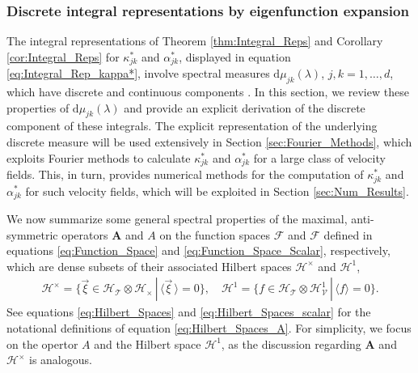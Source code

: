 \documentclass[11pt]{amsart}
\renewcommand{\d}{\mathrm{d}}
\newcommand{\Ab}{\mathbf{A}}
\newcommand{\Tc}{\mathcal{T}}
\newcommand{\Vc}{\mathcal{V}}
\newcommand{\Hc}{\mathcal{H}}
\newcommand{\Fc}{\mathcal{F}}
\newcommand{\Hs}{\mathscr{H}}
\newcommand{\Fs}{\mathscr{F}}
\begin{document}
\subsubsection{Discrete integral representations by eigenfunction
  expansion}\label{sec:Eig_Funct_Exp} 
%
The integral representations of Theorem \ref{thm:Integral_Reps} and
Corollary \ref{cor:Integral_Reps} for $\kappa^*_{jk}$ and $\alpha^*_{jk}$,
displayed in equation \eqref{eq:Integral_Rep_kappa*},  involve
spectral measures $\d\mu_{jk}(\lambda)$, $j,k=1,\ldots,d$, which have discrete and
continuous components \cite{Reed-1980,Stone:64}. In this section, we
review these properties of $\d\mu_{jk}(\lambda)$ and provide an explicit
derivation of the discrete component of these integrals. The 
explicit representation of the underlying discrete measure will
be used extensively in Section \ref{sec:Fourier_Methods}, which
exploits Fourier methods to calculate $\kappa^*_{jk}$ and $\alpha^*_{jk}$ for a
large class of velocity fields. This, in turn, provides numerical
methods for the computation of $\kappa^*_{jk}$ and $\alpha^*_{jk}$ for such
velocity fields, which will be exploited in Section
\ref{sec:Num_Results}.   



We now summarize some general spectral properties of the maximal,
anti-symmetric operators $\Ab$ and $A$ on the function spaces $\Fs$
and $\Fc$ defined in equations \eqref{eq:Function_Space} and
\eqref{eq:Function_Space_Scalar}, respectively, which are dense
subsets of their associated Hilbert spaces $\Hs^\times$ and $\Hc^1$,  
%
\begin{align}\label{eq:Hilbert_Spaces_A}
  \Hs^\times=\{\vec{\xi}\in \Hs_\Tc\otimes\Hs_\times \,|\, \langle\vec{\xi}\,\rangle=0\},\quad
  \Hc^1=\{f\in \Hc_\Tc\otimes\Hc^1_\Vc \,|\, \langle f\rangle=0\}.
\end{align}
%
See equations \eqref{eq:Hilbert_Spaces} and
\eqref{eq:Hilbert_Spaces_scalar} for the notational definitions of
equation \eqref{eq:Hilbert_Spaces_A}. For simplicity, we focus on the 
opertor $A$ and the Hilbert space $\Hc^1$, as the discussion regarding
$\Ab$ and $\Hs^\times$ is analogous.
\end{document}
